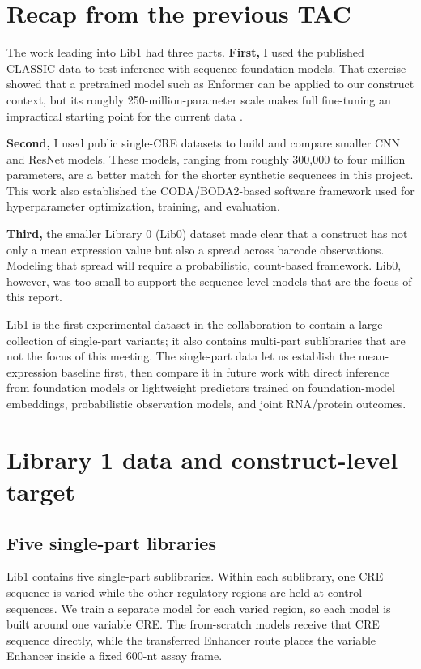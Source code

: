\documentclass[11pt]{article}
\begin{document}
\section{Recap from the previous TAC}

The work leading into Lib1 had three parts. \textbf{First,} I used the published CLASSIC
data to test inference with sequence foundation models. That exercise showed
that a pretrained model such as Enformer can be applied to our construct
context, but its roughly 250-million-parameter scale makes full fine-tuning an
impractical starting point for the current data \cite{avsec2021enformer}.

\textbf{Second,} I used public single-CRE datasets to build and compare smaller CNN and
ResNet models. These models, ranging from roughly 300,000 to four million
parameters, are a better match for the shorter synthetic sequences in this
project. This work also established the CODA/BODA2-based software framework
used for hyperparameter optimization, training, and evaluation.

\textbf{Third,} the smaller Library 0 (Lib0) dataset made clear that a construct has not
only a mean expression value but also a spread across barcode observations.
Modeling that spread will require a probabilistic, count-based framework.
Lib0, however, was too small to support the sequence-level models that are the
focus of this report.

Lib1 is the first experimental dataset in the collaboration to contain a large
collection of single-part variants; it also contains multi-part sublibraries
that are not the focus of this meeting. The single-part data let us establish
the mean-expression baseline first, then compare it in future work with direct
inference from foundation models or lightweight predictors trained on
foundation-model embeddings, probabilistic observation models, and joint
RNA/protein outcomes.

\section{Library 1 data and construct-level target}

\subsection{Five single-part libraries}

Lib1 contains five single-part sublibraries. Within each sublibrary, one CRE
sequence is varied while the other regulatory regions are held at control
sequences. We train a separate model for each varied region, so each model
is built around one variable CRE. The from-scratch models receive that CRE
sequence directly, while the transferred Enhancer route places the variable
Enhancer inside a fixed 600-nt assay frame.
\end{document}
